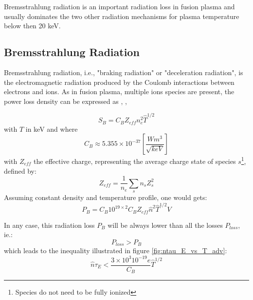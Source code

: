 Bremsstrahlung radiation is an important radiation loss in fusion plasma and usually dominates the two other radiation mechanisms for plasma temperature below then 20 keV. 



\subsection{Bremsstrahlung Radiation}
Bremsstrahlung radiation, i.e., "braking radiation" or "deceleration radiation", is the electromagnetic radiation produced by the Coulomb interactions between electrons and ions. As in fusion plasma, multiple ions species are present, the power loss density can be expressed as \cite[sec.3.3]{FusionCEA1987}, \cite[sec.4.24]{Wesson2004}, \cite[sec.3.5.4]{Freidberg2007}

\begin{equation}
S_B
=
C_B Z_{eff} n_e^2 \hat T^{1/2}
\end{equation}
with $\hat T$ in keV and where 
\begin{equation*}
C_B 
\approx
5.355 \times 10^{-37} \left[ \frac{W m^3}{ \sqrt{keV}} \right]
\end{equation*}
with $Z_{eff}$ the effective charge, representing the average
charge state of species $s$\footnote{Species do not need to be fully ionized}, defined by:
\begin{equation}
Z_{eff}
=
\frac{1}{n_e}
\sum_s
n_s Z_s^2
\label{eq:effective_charge_adv}
\end{equation}
Assuming constant density and temperature profile, one would gets:
\begin{equation}
	P_B
	=
	C_B 10^{19\times 2} 
	C_B Z_{eff} \hat n^2 \hat T^{1/2}
	V
\label{eq:Bremsstrahlung_Power_Loss}
\end{equation}

In any case, this radiation loss $P_B$ will be always lower than all the losses $P_{loss}$, ie.:
\begin{equation*}
	P_{loss} > P_B
\end{equation*}
which leads to the inequality illustrated in figure \ref{fig:ntau_E_vs_T_adv}:
\begin{equation}
	\hat n \tau_E < \frac{3\times 10^3 10^{-19} e }{C_B} \hat T^{1/2}
\end{equation}

